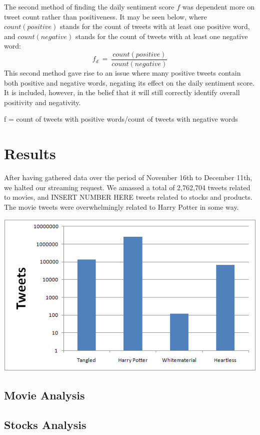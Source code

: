 \documentclass[11pt]{article}
\begin{document}
The second method of finding the daily sentiment score $f$ was dependent more on tweet count rather than positiveness. It may be seen below, where $count(positive)$ stands for the count of tweets with at least one positive word, and $count(negative)$ stands for the count of tweets with at least one negative word:
\begin{equation}
f_{d}\ =\ \frac{count(positive)}{count(negative)}
\end{equation}
This second method gave rise to an issue where many positive tweets contain both positive and negative words, negating its effect on the daily sentiment score. It is included, however, in the belief that it will still correctly identify overall positivity and negativity.

f = count of tweets with positive words/count of tweets with negative words

\section{Results}
After having gathered data over the period of November 16th to December 11th, we halted our streaming request. We amassed a total of 2,762,704 tweets related to movies, and INSERT NUMBER HERE tweets related to stocks and products. The movie tweets were overwhelmingly related to Harry Potter in some way.

\includegraphics[scale=.5]{img/PureTweets.png} 

\subsection{Movie Analysis}
\subsection{Stocks Analysis}
\end{document}
